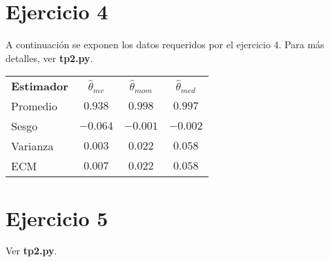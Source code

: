 \section{Ejercicio 4}
A continuación se exponen los datos requeridos por el ejercicio 4. Para más detalles, ver \textbf{tp2.py}.
\begin{table}[H]
	\centering
	\begin{tabular}{lccc}
		\textbf{Estimador} & $\hat{\theta}_{mv}$ & $\hat{\theta}_{mom}$ & $\hat{\theta}_{med}$ \\
		Promedio  & $0.938$ 				& $0.998$ 				& $0.997$ \\
		Sesgo     & $-0.064$ 				& $-0.001$ 				& $-0.002$ \\
		Varianza  & $0.003$ 				& $0.022$ 				& $0.058$ \\
		ECM       & $0.007$ 				& $0.022$ 				& $0.058$
	\end{tabular}
\end{table}

\section{Ejercicio 5}
Ver \textbf{tp2.py}.